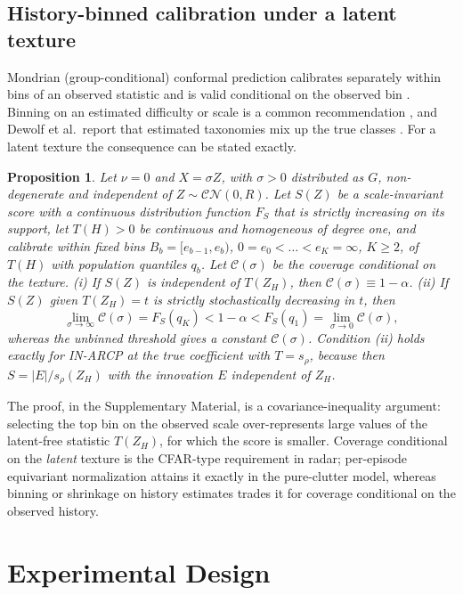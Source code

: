 \documentclass[journal]{IEEEtran}
\newtheorem{proposition}{Proposition}
\begin{document}
\subsection{History-binned calibration under a latent texture}
Mondrian (group-conditional) conformal prediction calibrates separately within bins of an observed statistic and is valid conditional on the observed bin \cite{vovk2012,bostrom2020}. Binning on an estimated difficulty or scale is a common recommendation \cite{bostrom2020}, and Dewolf et al.\ report that estimated taxonomies mix up the true classes \cite[\S5.2]{dewolf2025}. For a latent texture the consequence can be stated exactly.
\begin{proposition}\label{prop:mondrian}
Let $\nu=0$ and $X=\sigma Z$, with $\sigma>0$ distributed as $G$, non-degenerate and independent of $Z\sim\mathcal{CN}(0,R)$. Let $S(Z)$ be a scale-invariant score with a continuous distribution function $F_S$ that is strictly increasing on its support, let $T(H)>0$ be continuous and homogeneous of degree one, and calibrate within fixed bins $B_b=[e_{b-1},e_b)$, $0=e_0<\dots<e_K=\infty$, $K\ge2$, of $T(H)$ with population quantiles $q_b$. Let $\mathcal C(\sigma)$ be the coverage conditional on the texture.
(i) If $S(Z)$ is independent of $T(Z_H)$, then $\mathcal C(\sigma)\equiv1-\alpha$.
(ii) If $S(Z)$ given $T(Z_H)=t$ is strictly stochastically decreasing in $t$, then
\[
\lim_{\sigma\to\infty}\mathcal C(\sigma)=F_S(q_K)<1-\alpha<F_S(q_1)=\lim_{\sigma\to0}\mathcal C(\sigma),
\]
whereas the unbinned threshold gives a constant $\mathcal C(\sigma)$.
Condition (ii) holds exactly for IN-ARCP at the true coefficient with $T=s_\rho$, because then $S=|E|/s_\rho(Z_H)$ with the innovation $E$ independent of $Z_H$.
\end{proposition}
The proof, in the Supplementary Material, is a covariance-inequality argument: selecting the top bin on the observed scale over-represents large values of the latent-free statistic $T(Z_H)$, for which the score is smaller. Coverage conditional on the \emph{latent} texture is the CFAR-type requirement in radar; per-episode equivariant normalization attains it exactly in the pure-clutter model, whereas binning or shrinkage on history estimates trades it for coverage conditional on the observed history.

\section{Experimental Design}
\end{document}
